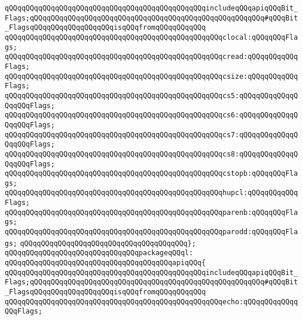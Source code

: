 \verb|qQQqqQQqqQQqqQQqqQQqqQQqqQQqqQQqqQQqqQQqqQQqqQQqincludeqQQqapiqQQqBit_Flags;qQQqqQQqqQQqqQQqqQQqqQQqqQQqqQQqqQQqqQQqqQQqqQQqqQQqqQQq#qQQqBit_FlagsqQQqqQQqqQQqqQQqqQQqisqQQqfromqQQqqQQqqQQq|\newline
\newline
\verb|qQQqqQQqqQQqqQQqqQQqqQQqqQQqqQQqqQQqqQQqqQQqqQQqqQQqclocal:qQQqqQQqFlags;|\newline
\verb|qQQqqQQqqQQqqQQqqQQqqQQqqQQqqQQqqQQqqQQqqQQqqQQqqQQqcread:qQQqqQQqqQQqFlags;|\newline
\verb|qQQqqQQqqQQqqQQqqQQqqQQqqQQqqQQqqQQqqQQqqQQqqQQqqQQqcsize:qQQqqQQqqQQqFlags;|\newline
\verb|qQQqqQQqqQQqqQQqqQQqqQQqqQQqqQQqqQQqqQQqqQQqqQQqqQQqcs5:qQQqqQQqqQQqqQQqqQQqFlags;|\newline
\verb|qQQqqQQqqQQqqQQqqQQqqQQqqQQqqQQqqQQqqQQqqQQqqQQqqQQqcs6:qQQqqQQqqQQqqQQqqQQqFlags;|\newline
\verb|qQQqqQQqqQQqqQQqqQQqqQQqqQQqqQQqqQQqqQQqqQQqqQQqqQQqcs7:qQQqqQQqqQQqqQQqqQQqFlags;|\newline
\verb|qQQqqQQqqQQqqQQqqQQqqQQqqQQqqQQqqQQqqQQqqQQqqQQqqQQqcs8:qQQqqQQqqQQqqQQqqQQqFlags;|\newline
\verb|qQQqqQQqqQQqqQQqqQQqqQQqqQQqqQQqqQQqqQQqqQQqqQQqqQQqcstopb:qQQqqQQqFlags;|\newline
\verb|qQQqqQQqqQQqqQQqqQQqqQQqqQQqqQQqqQQqqQQqqQQqqQQqqQQqhupcl:qQQqqQQqqQQqFlags;|\newline
\verb|qQQqqQQqqQQqqQQqqQQqqQQqqQQqqQQqqQQqqQQqqQQqqQQqqQQqparenb:qQQqqQQqFlags;|\newline
\verb|qQQqqQQqqQQqqQQqqQQqqQQqqQQqqQQqqQQqqQQqqQQqqQQqqQQqparodd:qQQqqQQqFlags;|\newline
\verb|qQQqqQQqqQQqqQQqqQQqqQQqqQQqqQQqqQQqqQQq};|\newline
\newline
\verb|qQQqqQQqqQQqqQQqqQQqqQQqqQQqqQQqpackageqQQql:|\newline
\verb|qQQqqQQqqQQqqQQqqQQqqQQqqQQqqQQqqQQqqQQqapiqQQq{|\newline
\verb|qQQqqQQqqQQqqQQqqQQqqQQqqQQqqQQqqQQqqQQqqQQqqQQqincludeqQQqapiqQQqBit_Flags;qQQqqQQqqQQqqQQqqQQqqQQqqQQqqQQqqQQqqQQqqQQqqQQqqQQqqQQq#qQQqBit_FlagsqQQqqQQqqQQqqQQqqQQqisqQQqfromqQQqqQQqqQQq|\newline
\newline
\verb|qQQqqQQqqQQqqQQqqQQqqQQqqQQqqQQqqQQqqQQqqQQqqQQqqQQqecho:qQQqqQQqqQQqqQQqFlags;|\newline
